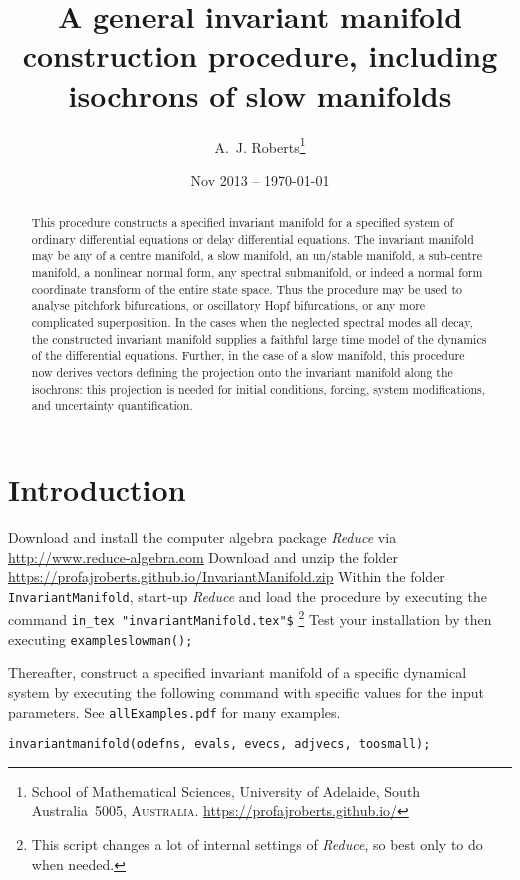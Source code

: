 \documentclass[11pt,a5paper]{article}
\title{A general invariant manifold construction procedure,
including isochrons of slow manifolds}
\author{A.~J. Roberts\thanks{School of Mathematical
Sciences, University of Adelaide, South Australia~5005,
\textsc{Australia}. \url{https://profajroberts.github.io/}}}
\date{Nov 2013 -- \today}
\begin{document}
\sloppy

\maketitle

\begin{abstract}
This procedure constructs a specified invariant manifold for
a specified system of ordinary differential equations or
delay differential equations. The invariant manifold may be
any of a centre manifold, a slow manifold, an un/stable
manifold, a sub-centre manifold, a nonlinear normal form,
any spectral submanifold, or indeed a normal form coordinate
transform of the entire state space. Thus the procedure may
be used to analyse pitchfork bifurcations, or oscillatory
Hopf bifurcations, or any more complicated superposition. In
the cases when the neglected spectral modes all decay, the
constructed invariant manifold supplies a faithful large
time model of the dynamics of the differential equations.
Further, in the case of a slow manifold, this procedure now
derives vectors defining the projection onto the invariant
manifold along the isochrons: this projection is needed for
initial conditions, forcing, system modifications, and
uncertainty quantification.
\end{abstract}

\tableofcontents



\section{Introduction}

Download and install the computer algebra package
\emph{Reduce} via \url{http://www.reduce-algebra.com}\quad
Download and unzip the folder
\url{https://profajroberts.github.io/InvariantManifold.zip}
\quad Within the folder \verb|InvariantManifold|, start-up
\emph{Reduce} and load the procedure by executing the
command \verb|in_tex "invariantManifold.tex"$|
\footnote{This script changes a lot of internal settings of
\emph{Reduce}, so best only to do when needed.} Test your
installation by then executing \verb|exampleslowman();|

Thereafter, construct a specified invariant manifold of a
specific dynamical system by executing the following command
with specific values for the input parameters.  See
\verb|allExamples.pdf| for many examples.
\begin{verbatim}
invariantmanifold(odefns, evals, evecs, adjvecs, toosmall);
\end{verbatim}
\end{document}
